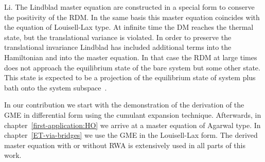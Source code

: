 \documentclass[12pt,twoside,a4paper]{report}
\begin{document}
Li. The Lindblad master equation \cite{lind76A}
    are constructed in a special form to conserve the positivity
    of the RDM.
    In the same basis this master equation coincides with
    the equation of Louisell-Lax type.    
    At infinite time the DM reaches
    the thermal state, but the translational variance is violated.
    In order to preserve the translational invariance
    Lindblad \cite{lind76B} has included additional terms into 
    the Hamiltonian and into the master equation.
    In that case the RDM at large times does not approach 
    the equilibrium state of
    the bare system but some other state.
    This state is expected to be a projection of 
    the equilibrium state of system plus bath 
    onto the system subspace~\cite{kohe97}.


In our contribution we start with 
the demonstration of 
the derivation of 
the GME in  differential form 
using the cumulant expansion technique.
Afterwards, in chapter~\ref{first-application:HO}
we arrive at a master equation of Agarwal type.
In chapter~\ref{ET-via-bridges}
we  use the GME 
in the  Louisell-Lax form.
The derived master equation with or without RWA is extensively used in
all parts of this work.
\end{document}
